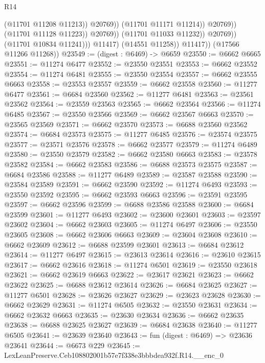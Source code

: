 \begin{lexlean}{R14}
\begin{coremodule}
                                          (@11701 @11208 @11213))
                                        @20769))
                                    (@11701 @11171 @11214))
                                  @20769))
                              (@11701 @11128 @11223))
                            @20769))
                        (@11701 @11033 @11232))
                      @20769))
                  (@11701 @10834 @11241)))
              @11417)
            (@14551 @11258))
          @11417))
      (@17566 @11266 @11268))
@23549 := (digest : @6469) -> @6659
@23550 := @6662 @6665
@23551 := @11274 @6477
@23552 := @23550 @23551
@23553 := @6662 @23552
@23554 := @11274 @6481
@23555 := @23550 @23554
@23557 := @6662 @23555 @6663
@23558 := @23553 @23557
@23559 := @6662 @23558
@23560 := @11277 @6477
@23561 := @6684 @23560
@23562 := @11277 @6481
@23563 := @23561 @23562
@23564 := @23559 @23563
@23565 := @6662 @23564
@23566 := @11274 @6485
@23567 := @23550 @23566
@23569 := @6662 @23567 @6663
@23570 := @23565 @23569
@23571 := @6662 @23570
@23573 := @6688 @23560 @23562
@23574 := @6684 @23573
@23575 := @11277 @6485
@23576 := @23574 @23575
@23577 := @23571 @23576
@23578 := @6662 @23577
@23579 := @11274 @6489
@23580 := @23550 @23579
@23582 := @6662 @23580 @6663
@23583 := @23578 @23582
@23584 := @6662 @23583
@23586 := @6688 @23573 @23575
@23587 := @6684 @23586
@23588 := @11277 @6489
@23589 := @23587 @23588
@23590 := @23584 @23589
@23591 := @6662 @23590
@23592 := @11274 @6493
@23593 := @23550 @23592
@23595 := @6662 @23593 @6663
@23596 := @23591 @23595
@23597 := @6662 @23596
@23599 := @6688 @23586 @23588
@23600 := @6684 @23599
@23601 := @11277 @6493
@23602 := @23600 @23601
@23603 := @23597 @23602
@23604 := @6662 @23603
@23605 := @11274 @6497
@23606 := @23550 @23605
@23608 := @6662 @23606 @6663
@23609 := @23604 @23608
@23610 := @6662 @23609
@23612 := @6688 @23599 @23601
@23613 := @6684 @23612
@23614 := @11277 @6497
@23615 := @23613 @23614
@23616 := @23610 @23615
@23617 := @6662 @23616
@23618 := @11274 @6501
@23619 := @23550 @23618
@23621 := @6662 @23619 @6663
@23622 := @23617 @23621
@23623 := @6662 @23622
@23625 := @6688 @23612 @23614
@23626 := @6684 @23625
@23627 := @11277 @6501
@23628 := @23626 @23627
@23629 := @23623 @23628
@23630 := @6662 @23629
@23631 := @11274 @6505
@23632 := @23550 @23631
@23634 := @6662 @23632 @6663
@23635 := @23630 @23634
@23636 := @6662 @23635
@23638 := @6688 @23625 @23627
@23639 := @6684 @23638
@23640 := @11277 @6505
@23641 := @23639 @23640
@23643 := fun (digest : @6469) => @23636 @23641
@23644 := @6673 @229
@23645 := LexLeanPreserve.Ceb108802001b57e7f338e3bbbdea932f.R14.__enc_0

\end{coremodule}
\end{lexlean}
